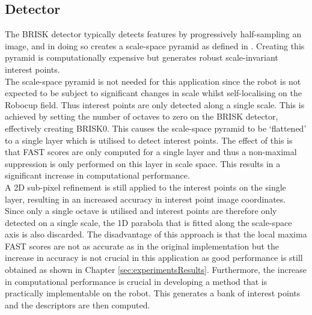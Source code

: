 \subsection{Detector}
\label{sec:BRISK0Detect}
The BRISK detector typically detects features by progressively half-sampling an image, and in doing so creates a scale-space pyramid as defined in . Creating this pyramid is computationally expensive but generates robust scale-invariant interest points.\\

The scale-space pyramid is not needed for this application since the robot is not expected to be subject to significant changes in scale whilst self-localising on the Robocup field. Thus interest points are only detected along a single scale. This is achieved by setting the number of octaves to zero on the BRISK detector, effectively creating BRISK0. This causes the scale-space pyramid to be `flattened' to a single layer which is utilised to detect interest points. The effect of this is that FAST scores are only computed for a single layer and thus a non-maximal suppression is only performed on this layer in scale space. This results in a significant increase in computational performance. \\


A 2D sub-pixel refinement is still applied to the interest points on the single layer, resulting in an increased accuracy in interest point image coordinates.\\

Since only a single octave is utilised and interest points are therefore only detected on a single scale, the 1D parabola that is fitted along the scale-space axis \citep{Leutenegger2011} is also discarded. The disadvantage of this approach is that the local maxima FAST scores are not as accurate as in the original implementation but the increase in accuracy is not crucial in this application as good performance is still obtained as shown in Chapter \ref{sec:experimentsResults}. Furthermore, the increase in computational performance is crucial in developing a method that is practically implementable on the robot. This generates a bank of interest points and the descriptors are then computed.\\


